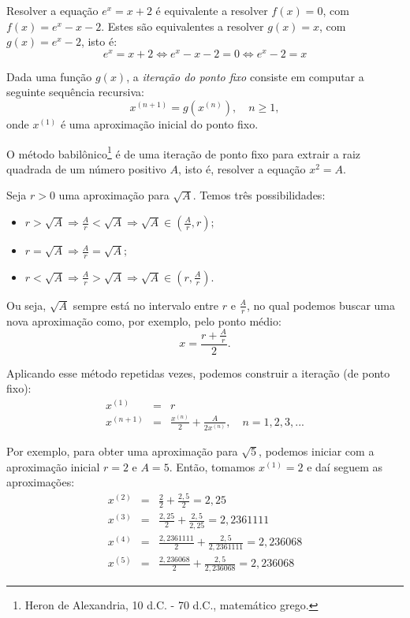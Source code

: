\begin{ex}\label{ex:ponto_fixo_1}
  Resolver a equação $e^x = x + 2$ é equivalente a resolver $f(x) = 0$, com $f(x) = e^x - x - 2$. Estes são equivalentes a resolver $g(x) = x$, com $g(x) = e^x - 2$, isto é:
  \begin{equation*}
    e^x = x + 2 \Leftrightarrow e^x - x - 2 = 0 \Leftrightarrow e^x - 2 = x
  \end{equation*}
\end{ex}

Dada uma função $g(x)$, a \emph{iteração do ponto fixo} consiste em computar a seguinte sequência recursiva:
\begin{equation*}
  x^{(n+1)} = g(x^{(n)}), \quad n\geq 1,
\end{equation*}
onde $x^{(1)}$ é uma aproximação inicial do ponto fixo.

\begin{ex}
O método babilônico\footnote{Heron de Alexandria, 10 d.C. - 70 d.C., matemático grego.} é de uma iteração de ponto fixo para extrair a raiz quadrada de um número positivo $A$, isto é, resolver a equação $x^2 = A$.

Seja $r>0$ uma aproximação para $\sqrt{A}$. Temos três possibilidades:
\begin{itemize}
\item $r>\sqrt{A} \Longrightarrow \frac{A}{r}<\sqrt{A} \Longrightarrow \sqrt{A}\in \left(\frac{A}{r}, r\right);$
\item $r=\sqrt{A} \Longrightarrow \frac{A}{r}=\sqrt{A};$
\item $r<\sqrt{A} \Longrightarrow \frac{A}{r}>\sqrt{A} \Longrightarrow \sqrt{A}\in \left(r, \frac{A}{r}\right).$
\end{itemize}
Ou seja, $\sqrt{A}$ sempre está no intervalo entre $r$ e $\frac{A}{r}$, no qual podemos buscar uma nova aproximação como, por exemplo, pelo ponto médio:
$$x=\frac{r+\frac{A}{r}}{2}.$$

Aplicando esse método repetidas vezes, podemos construir a iteração (de ponto fixo):
\begin{eqnarray*}
x^{(1)}&=&r \\
x^{(n+1)}&=&\frac{x^{(n)}}{2}+\frac{A}{2x^{(n)}}, \quad n=1,2,3,...
\end{eqnarray*}

Por exemplo, para obter uma aproximação para $\sqrt{5}$, podemos iniciar com a aproximação inicial $r=2$ e $A=5$. Então, tomamos $x^{(1)} = 2$ e daí seguem as aproximações:
\begin{eqnarray*}
x^{(2)}&=&\frac{2}{2}+\frac{2,5}{2} = 2,25\\
x^{(3)}&=&\frac{2,25}{2}+\frac{2,5}{2,25}= 2,2361111  \\
x^{(4)}&=&\frac{2,2361111}{2}+\frac{2,5}{2,2361111}= 2,236068  \\
x^{(5)}&=&\frac{2,236068}{2}+\frac{2,5}{2,236068}= 2,236068
\end{eqnarray*}
\end{ex}  

